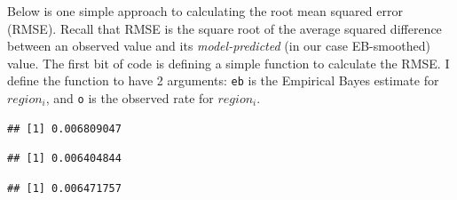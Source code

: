\documentclass[
]{book}
\newenvironment{Shaded}{\begin{snugshade}}{\end{snugshade}}
\newcommand{\ControlFlowTok}[1]{\textcolor[rgb]{0.13,0.29,0.53}{\textbf{#1}}}
\newcommand{\DecValTok}[1]{\textcolor[rgb]{0.00,0.00,0.81}{#1}}
\newcommand{\FunctionTok}[1]{\textcolor[rgb]{0.00,0.00,0.00}{#1}}
\newcommand{\NormalTok}[1]{#1}
\newcommand{\OtherTok}[1]{\textcolor[rgb]{0.56,0.35,0.01}{#1}}
\newcommand{\SpecialCharTok}[1]{\textcolor[rgb]{0.00,0.00,0.00}{#1}}
\begin{document}
Below is one simple approach to calculating the root mean squared error (RMSE). Recall that RMSE is the square root of the average squared difference between an observed value and its \emph{model-predicted} (in our case EB-smoothed) value. The first bit of code is defining a simple function to calculate the RMSE. I define the function to have 2 arguments: \texttt{eb} is the Empirical Bayes estimate for \(region_i\), and \texttt{o} is the observed rate for \(region_i\).

\begin{Shaded}
\end{Shaded}

\begin{verbatim}
## [1] 0.006809047
\end{verbatim}

\begin{Shaded}
\end{Shaded}

\begin{verbatim}
## [1] 0.006404844
\end{verbatim}

\begin{Shaded}
\end{Shaded}

\begin{verbatim}
## [1] 0.006471757
\end{verbatim}

\begin{Shaded}
\end{Shaded}
\end{document}
